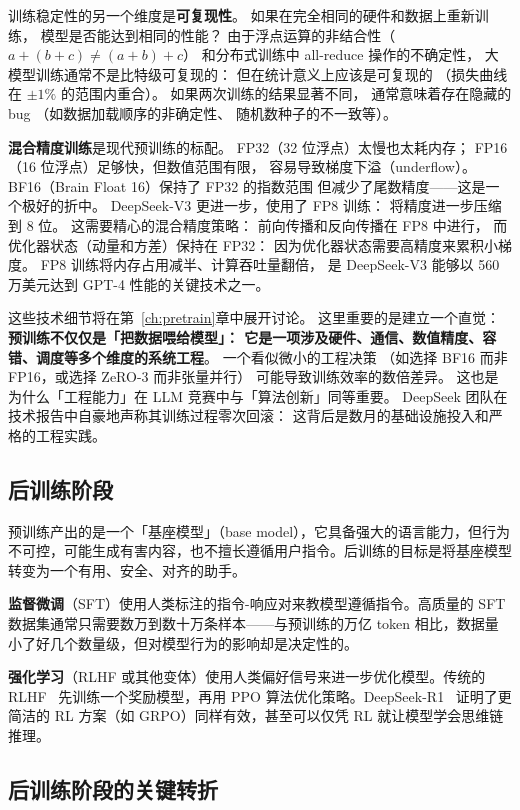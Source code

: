 训练稳定性的另一个维度是\textbf{可复现性}。
如果在完全相同的硬件和数据上重新训练，
模型是否能达到相同的性能？
由于浮点运算的非结合性（$a + (b + c) \neq (a + b) + c$）
和分布式训练中 all-reduce 操作的不确定性，
大模型训练通常不是比特级可复现的：
但在统计意义上应该是可复现的
（损失曲线在 $\pm 1\%$ 的范围内重合）。
如果两次训练的结果显著不同，
通常意味着存在隐藏的 bug
（如数据加载顺序的非确定性、
随机数种子的不一致等）。

\textbf{混合精度训练}是现代预训练的标配。
FP32（32 位浮点）太慢也太耗内存；
FP16（16 位浮点）足够快，但数值范围有限，
容易导致梯度下溢（underflow）。
BF16（Brain Float 16）保持了 FP32 的指数范围
但减少了尾数精度——这是一个极好的折中。
DeepSeek-V3 更进一步，使用了 FP8 训练：
将精度进一步压缩到 8 位。
这需要精心的混合精度策略：
前向传播和反向传播在 FP8 中进行，
而优化器状态（动量和方差）保持在 FP32：
因为优化器状态需要高精度来累积小梯度。
FP8 训练将内存占用减半、计算吞吐量翻倍，
是 DeepSeek-V3 能够以 560 万美元达到 GPT-4 性能的关键技术之一。

这些技术细节将在第~\ref{ch:pretrain}章中展开讨论。
这里重要的是建立一个直觉：
\textbf{预训练不仅仅是「把数据喂给模型」：
它是一项涉及硬件、通信、数值精度、容错、调度等多个维度的系统工程}。
一个看似微小的工程决策
（如选择 BF16 而非 FP16，或选择 ZeRO-3 而非张量并行）
可能导致训练效率的数倍差异。
这也是为什么「工程能力」在 LLM 竞赛中与「算法创新」同等重要。
DeepSeek 团队在技术报告中自豪地声称其训练过程零次回滚：
这背后是数月的基础设施投入和严格的工程实践。

\subsection{后训练阶段}

预训练产出的是一个「基座模型」（base model），它具备强大的语言能力，但行为不可控，可能生成有害内容，也不擅长遵循用户指令。后训练的目标是将基座模型转变为一个有用、安全、对齐的助手。

\textbf{监督微调}（SFT）使用人类标注的指令-响应对来教模型遵循指令。高质量的 SFT 数据集通常只需要数万到数十万条样本——与预训练的万亿 token 相比，数据量小了好几个数量级，但对模型行为的影响却是决定性的。

\textbf{强化学习}（RLHF 或其他变体）使用人类偏好信号来进一步优化模型。传统的 RLHF~\cite{ouyang2022rlhf} 先训练一个奖励模型，再用 PPO 算法优化策略。DeepSeek-R1~\cite{deepseekr1} 证明了更简洁的 RL 方案（如 GRPO）同样有效，甚至可以仅凭 RL 就让模型学会思维链推理。

\subsection{后训练阶段的关键转折}


